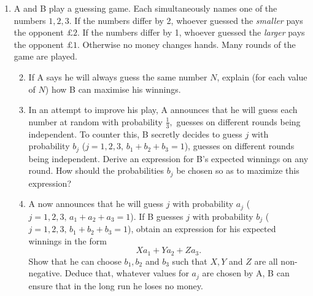 \documentclass[a4, 11pt]{report}
\newlength{\qspace}
\newcounter{qnumber}
\newenvironment{question}%
 {\vspace{\qspace}
  \begin{enumerate}[\bfseries 1\quad][10]%
    \setcounter{enumi}{\value{qnumber}}%
    \item%
 }
{
  \end{enumerate}
  \filbreak
  \stepcounter{qnumber}
 }
\newenvironment{questionparts}[1][1]%
 {
  \begin{enumerate}[\bfseries (i)]%
    \setcounter{enumii}{#1}
    \addtocounter{enumii}{-1}
    \setlength{\itemsep}{5mm}
    \setlength{\parskip}{8pt}
 }
 {
  \end{enumerate}
 }
\begin{document}
\begin{question}
 A and B play a guessing game. Each simultaneously names one of the
numbers $1,2,3.$ If the numbers differ by 2, whoever guessed the
\textit{smaller }pays the opponent $\pounds 2$. If the numbers differ
by 1, whoever guessed the \textit{larger }pays the opponent $\pounds 1.$
Otherwise no money changes hands. Many rounds of the game are played. 

\begin{questionparts}
\item If A says he will always guess the same number $N$, explain (for
each value of $N$) how B can maximise his winnings. 
\item In an attempt to improve his play, A announces that he will guess
each number at random with probability $\frac{1}{3},$ guesses on
different rounds being independent. To counter this, B secretly decides
to guess $j$ with probability $b_{j}$ ($j=1,2,3,\, b_{1}+b_{2}+b_{3}=1$),
guesses on different rounds being independent. Derive an expression
for B's expected winnings on any round. How should the probabilities
$b_{j}$ be chosen so as to maximize this expression? 
\item A now announces that he will guess $j$ with probability $a_{j}$
($j=1,2,3,\, a_{1}+a_{2}+a_{3}=1$). If B guesses $j$ with probability
$b_{j}$ ($j=1,2,3,\, b_{1}+b_{2}+b_{3}=1$), obtain an expression
for his expected winnings in the form 
\[
Xa_{1}+Ya_{2}+Za_{3}.
\]
Show that he can choose $b_{1},b_{2}$ and $b_{3}$ such that $X,Y$
and $Z$ are all non-negative. Deduce that, whatever values for $a_{j}$
are chosen by A, B can ensure that in the long run he loses no money.
 \end{questionparts}
\end{question}
\end{document}
